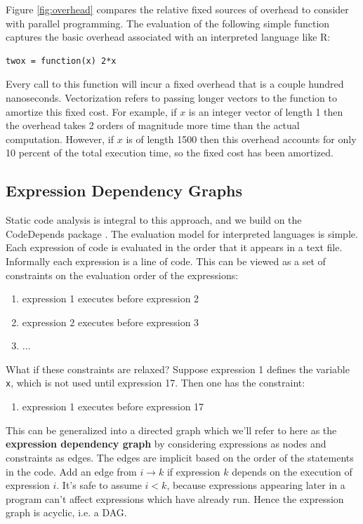 \documentclass[12pt]{article}
\begin{document}
Figure \ref{fig:overhead} compares the relative fixed sources of overhead to
consider with parallel programming. The evaluation of the following simple
function captures the basic overhead associated with an interpreted
language like R:
\begin{verbatim}
twox = function(x) 2*x
\end{verbatim}
Every call to this function will incur a fixed overhead that is a couple
hundred nanoseconds. Vectorization refers to passing longer vectors to the
function to amortize this fixed cost. For example, if $x$ is an integer
vector of length 1 then the overhead takes 2 orders of magnitude more time
than the actual computation. However, if $x$ is of length 1500 then this
overhead accounts for only 10 percent of the total execution time, so the
fixed cost has been amortized.

\subsection{Expression Dependency Graphs}

Static code analysis is integral to this approach, and we build on the 
CodeDepends package \cite{R-CodeDepends}.
The evaluation model for interpreted languages is simple. Each
expression of code is evaluated in the order that it appears in a text file. Informally
each expression is a line of code. This can be
viewed as a set of constraints on the evaluation order of the expressions:

\begin{enumerate}
    \item expression 1 executes before expression 2
    \item expression 2 executes before expression 3
    \item $\dots$
\end{enumerate}
What if these constraints are relaxed? Suppose expression 1 defines the variable
\texttt{x}, which is not used until expression 17. Then one has the
constraint:
\begin{enumerate}
    \item expression 1 executes before expression 17
\end{enumerate}
This can be generalized into a directed graph which we'll refer to here as
the \textbf{expression dependency graph} by considering expressions as
nodes and constraints as edges. The edges are implicit based on the order
of the statements in the code. Add an edge from $i \rightarrow k$ if
expression $k$ depends on the execution of expression $i$.  It's safe to
assume $i < k$, because expressions appearing later in a program can't
affect expressions which have already run. Hence the expression graph is
acyclic, i.e. a DAG.
\end{document}
